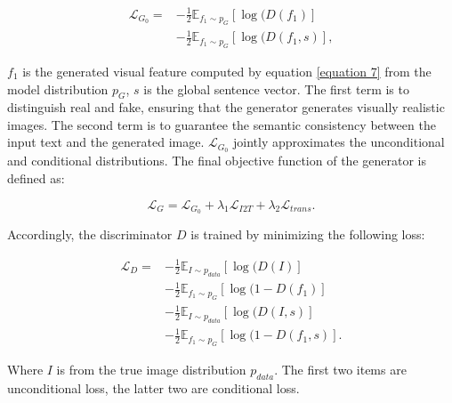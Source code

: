 \documentclass[11pt]{article}
\begin{document}
\begin{equation}
\begin{split}
        \mathcal{L}_{G_{0}}=&-\frac{1}{2}\mathbb{E}_{f_{1}\sim p_{G}}[\log(D(f_{1})]\\ &-\frac{1}{2}\mathbb{E}_{f_{1}\sim p_{G}}[\log(D(f_{1},s)],
\end{split}
\end{equation}

$f_{1}$ is the generated visual feature computed by equation \ref{equation 7} from the model distribution $p_{G}$, $s$ is the global sentence vector. The first term is to distinguish real and fake, ensuring that the generator generates visually realistic images. The second term is to guarantee the semantic consistency between the input text and the generated image. $\mathcal{L}_{G_{0}}$ jointly approximates the unconditional and conditional distributions. The final objective function of the generator is defined as:

\begin{equation}
    \mathcal{L}_{G}=\mathcal{L}_{G_{0}}+\lambda_{1}\mathcal{L}_{I2T}+ \lambda_{2}\mathcal{L}_{trans}.
\label{equ15}
\end{equation}

Accordingly, the discriminator $D$ is trained by minimizing the following loss:

\begin{equation}
\begin{split}
    \mathcal{L}_{D} =&-\frac{1}{2} \mathbb{E}_{I\sim p_{data}}[\log(D(I)]\\
    &-\frac{1}{2} \mathbb{E}_{f_{1}\sim p_{G}}[\log(1-D(f_{1})] \\
    &-\frac{1}{2} \mathbb{E}_{I\sim p_{data}}[\log(D(I,s)]\\
    &-\frac{1}{2} \mathbb{E}_{f_{1}\sim p_{G}}[\log(1-D(f_{1},s)].
\end{split}
\end{equation}

Where $I$ is from the true image distribution $p_{data}$. The first two items are unconditional loss, the latter two are conditional loss.
\end{document}

